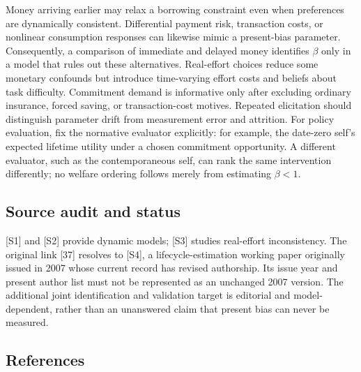 \documentclass[11pt,a4paper]{article}
\begin{document}
Money arriving earlier may relax a borrowing constraint even when preferences are dynamically consistent. Differential payment risk, transaction costs, or nonlinear consumption responses can likewise mimic a present-bias parameter. Consequently, a comparison of immediate and delayed money identifies $\beta$ only in a model that rules out these alternatives. Real-effort choices reduce some monetary confounds but introduce time-varying effort costs and beliefs about task difficulty. Commitment demand is informative only after excluding ordinary insurance, forced saving, or transaction-cost motives. Repeated elicitation should distinguish parameter drift from measurement error and attrition. For policy evaluation, fix the normative evaluator explicitly: for example, the date-zero self's expected lifetime utility under a chosen commitment opportunity. A different evaluator, such as the contemporaneous self, can rank the same intervention differently; no welfare ordering follows merely from estimating $\beta<1$.

\subsection*{Source audit and status}

[S1] and [S2] provide dynamic models; [S3] studies real-effort inconsistency. The original link [37] resolves to [S4], a lifecycle-estimation working paper originally issued in 2007 whose current record has revised authorship. Its issue year and present author list must not be represented as an unchanged 2007 version. The additional joint identification and validation target is editorial and model-dependent, rather than an unanswered claim that present bias can never be measured.

\subsection*{References}
\end{document}
